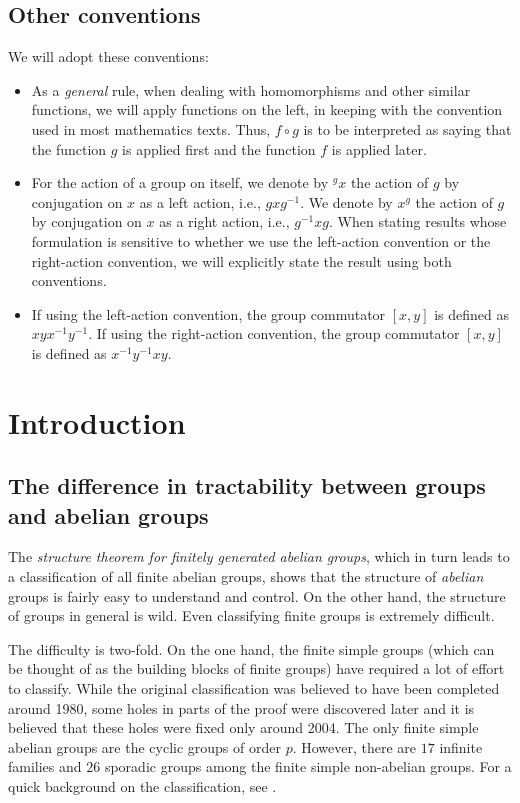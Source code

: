 \documentclass{ucetd}
\begin{document}
\subsection{Other conventions}

We will adopt these conventions:

\begin{itemize}
\item As a {\em general} rule, when dealing with homomorphisms and
  other similar functions, we will apply functions on the left, in
  keeping with the convention used in most mathematics texts. Thus, $f
  \circ g$ is to be interpreted as saying that the function $g$ is
  applied first and the function $f$ is applied later.
\item For the action of a group on itself, we denote by ${}^gx$ the
  action of $g$ by conjugation on $x$ as a left action, i.e.,
  $gxg^{-1}$. We denote by $x^g$ the action of $g$ by conjugation on
  $x$ as a right action, i.e., $g^{-1}xg$. When stating results whose
  formulation is sensitive to whether we use the left-action
  convention or the right-action convention, we will explicitly state
  the result using both conventions.
\item If using the left-action convention, the group commutator
  $[x,y]$ is defined as $xyx^{-1}y^{-1}$. If using the right-action
  convention, the group commutator $[x,y]$ is defined as
  $x^{-1}y^{-1}xy$.
\end{itemize}

\section{Introduction}\label{sec:intro}

\subsection{The difference in tractability between groups and abelian groups}

The {\em structure theorem for finitely generated abelian groups},
which in turn leads to a classification of all finite abelian groups,
shows that the structure of {\em abelian} groups is fairly easy to
understand and control. On the other hand, the structure of groups in
general is wild.  Even classifying finite groups is extremely
difficult.

The difficulty is two-fold. On the one hand, the finite simple groups
(which can be thought of as the building blocks of finite groups) have
required a lot of effort to classify. While the original
classification was believed to have been completed around 1980, some
holes in parts of the proof were discovered later and it is believed
that these holes were fixed only around 2004. The only finite simple
abelian groups are the cyclic groups of order $p$. However, there are
$17$ infinite families and $26$ sporadic groups among the finite
simple non-abelian groups. For a quick background on the
classification, see \cite{Asch2004}.
\end{document}
